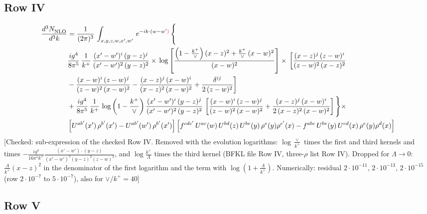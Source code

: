 \documentclass[9pt]{article}
\numberwithin{equation}{section}
\begin{document}
\subsection{Row IV}
\begin{align}
    \frac{d^{3}N_{\rm NLO}^{\rm}}{d^{3}k}  & =   \frac{1}{(2\pi)^{3}}\,
    \int_{x,y,z,w,x',w'}\,e^{-ik\cdot (w-w^\prime{\color{red})}}\,\Bigg\{\notag \\
& \frac{ig^{4}}{8\pi^{5}}\,\frac{1}{k^{+}}\,\frac{(x'-w')^{i}\,(y-z)^{j}}{(x'-w')^{2}\,(y-z)^{2}}\times\,\log{\left[\frac{\left(1-\frac{k^{+}}{\vee}\right)(x-z)^{2}+\frac{k^{+}}{\vee}\,(x-w)^{2}}{(x-w)^{2}}\right]}\times\, \bigg[\frac{(x-z)^{j}\,(z-w)^{i}}{(z-w)^{2}\,(x-z)^{2}}\notag \\ & -\frac{(x-w)^{i}\,(z-w)^{j}}{(z-w)^{2}\,(x-w)^{2}}-\frac{(x-z)^{j}\,(x-w)^{i}}{(x-z)^{2}\,(x-w)^{2}}+\frac{\delta^{ij}}{2\,(z-w)^{2}}\bigg] \notag \\
& + \frac{ig^{4}}{8\pi^{5}}\,\frac{1}{k^{+}}\,\log{\left(1-\frac{k^{+}}{\vee}\right)}\,\frac{(x'-w')^{i}\,(y-z)^{j}}{(x'-w')^{2}\,(y-z)^{2}}\,\left[\frac{(x-w)^{i}\,(z-w)^{j}}{(z-w)^{2}\,(x-w)^{2}}+\frac{(x-z)^{j}\,(x-w)^{i}}{2\, (x-z)^{2}\,(x-w)^{2}}\right]\Bigg\}\times\notag \\ &  \left[U^{ab'}(x')\,\rho^{b'}(x')-U^{ab'}(w')\,\rho^{b'}(x')\right] \left[f^{cdc'}\,U^{ac}(w)\,U^{bd}(z)\,U^{be}(y)\,\rho^{e}(y)\rho^{c'}(x)-f^{abc}\,U^{be}(y)\,U^{cd}(x)\,\rho^{e}(y)\rho^{d}(x)\right]
\end{align} {\color{red}[Checked: sub-expression of the checked Row IV. Removed with the evolution logarithms: $\log\frac{\vee}{k^{+}}$ times the first and third kernels and times $-\frac{ig^{4}}{16\pi^{5}k^{+}}\frac{(x'-w')\cdot(y-z)}{(x'-w')^{2}(y-z)^{2}(z-w)^{2}}$, and $\log\frac{k^{+}}{\Lambda}$ times the third kernel (BFKL file Row IV, three-$\rho$ list Row IV). Dropped for $\Lambda\to0$: $\frac{\Lambda}{k^{+}}(x-z)^{2}$ in the denominator of the first logarithm and the term with $\log(1+\frac{\Lambda}{k^{+}})$. Numerically: residual $2\cdot10^{-11}$, $2\cdot10^{-13}$, $2\cdot10^{-15}$ (row $2\cdot10^{-7}$ to $5\cdot10^{-7}$), also for $\vee/k^{+}=40$]}\par\noindent
\subsection{Row V}
\end{document}
